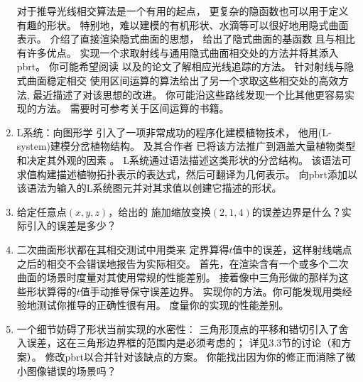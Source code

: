 \begin{enumerate}
          对于推导光线相交算法是一个有用的起点，
          更复杂的隐函数也可以用于定义有趣的形状。
          特别地，难以建模的有机形状、水滴等可以很好地用隐式曲面表示。
          \citet{10.1145/357306.357310}介绍了直接渲染隐式曲面的思想，
          \citet{Wyvill1989}给出了隐式曲面的基函数
          且与\citeauthor{10.1145/357306.357310}相比有许多优点。
          实现一个求取射线与通用隐式曲面相交处的方法并将其添入pbrt。
          你可能希望阅读\citet{10.1145/74333.74364}
          以及\citet{Hart1996}的论文了解相应光线追踪的方法。
          \citet{10.5555/93267.93276}针对射线与隐式曲面稳定相交
          使用区间运算的算法给出了另一个求取这些相交处的高效方法,
          最近\citet{10.1111/j.1467-8659.2008.01189.x}描述了对该思想的改进。
          你可能沿这些路线发现一个比其他更容易实现的方法。
          需要时可参考\citet{moore1966interval}关于区间运算的书籍。
    \item \circlethree L系统：\citet{10.1145/800031.808571}向图形学
          引入了一项非常成功的程序化建模植物技术，
          他用(L-system)建模分岔植物结构。
          \citeauthor{Prusinkiewicz:1986:10.20380/GI1986.44}及其合作者
          已将该方法推广到涵盖大量植物类型和决定其外观的因素
          \citep{Prusinkiewicz:1986:10.20380/GI1986.44,10.1145/192161.192254,
              10.1145/280814.280898,10.1145/383259.383291}。
          L系统通过语法描述这类形状的分岔结构。
          该语法可求值构建描述植物拓扑表示的表达式，然后可翻译为几何表示。
          向pbrt添加以该语法为输入的L系统图元并对其求值以创建它描述的形状。
    \item \circleone 给定任意点$(x,y,z)$，给出的
          施加缩放变换$(2,1,4)$的误差边界是什么？实际引入的误差是多少？
    \item \circletwo 二次曲面形状都在其相交测试中用类来
          定界算得$t$值中的误差，这样射线端点之后的相交不会错误地报告为实际相交。
          首先，在渲染含有一个或多个二次曲面的场景时度量对其使用常规的性能差别。
          接着像中三角形做的那样为这些形状算得的$t$值手动推导保守误差边界。
          实现你的方法。你可能发现用类经验地测试你推导的正确性很有用。
          度量你的实现的性能差别。
    \item \circletwo 一个细节妨碍了形状当前实现的水密性：
          三角形顶点的平移和错切引入了舍入误差，这在三角形边界框的范围内是必须考虑的；
          详见\citet{Woop2013Watertight}3.3节的讨论（和方案）。
          修改pbrt以合并针对该缺点的方案。
          你能找出因为你的修正而消除了微小图像错误的场景吗？

\end{enumerate}
